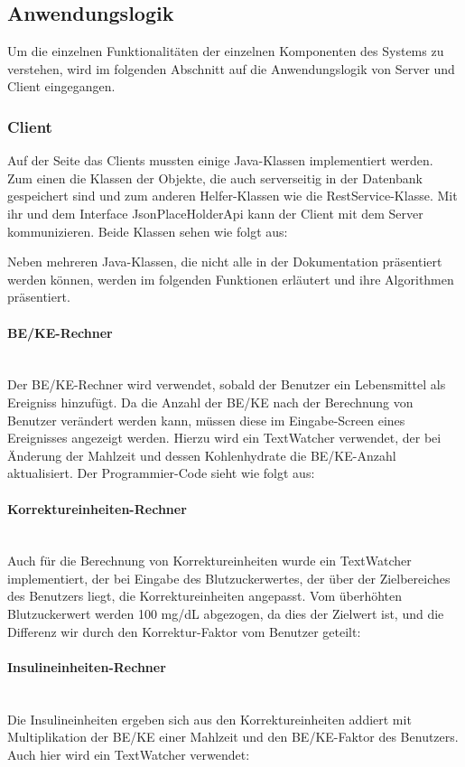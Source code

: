 	\subsection{Anwendungslogik}
	Um die einzelnen Funktionalitäten der einzelnen Komponenten des Systems zu verstehen, wird im folgenden Abschnitt auf die Anwendungslogik von Server und Client eingegangen.
	\subsubsection{Client}
	Auf der Seite das Clients mussten einige Java-Klassen implementiert werden. Zum einen die Klassen der Objekte, die auch serverseitig in der Datenbank gespeichert sind und zum anderen Helfer-Klassen wie die RestService-Klasse. Mit ihr und dem Interface JsonPlaceHolderApi kann der Client mit dem Server kommunizieren. Beide Klassen sehen wie folgt aus:
	
	
	Neben mehreren Java-Klassen, die nicht alle in der Dokumentation präsentiert werden können, werden im folgenden Funktionen erläutert und ihre Algorithmen präsentiert.
	\paragraph{BE/KE-Rechner}$~$\\
	Der BE/KE-Rechner wird verwendet, sobald der Benutzer ein Lebensmittel als Ereigniss hinzufügt. Da die Anzahl der BE/KE nach der Berechnung von Benutzer verändert werden kann, müssen diese im Eingabe-Screen eines Ereignisses angezeigt werden. Hierzu wird ein TextWatcher verwendet, der bei Änderung der Mahlzeit und dessen Kohlenhydrate die BE/KE-Anzahl aktualisiert. Der Programmier-Code sieht wie folgt aus:
	
	\paragraph{Korrektureinheiten-Rechner}$~$\\
	Auch für die Berechnung von Korrektureinheiten wurde ein TextWatcher implementiert, der bei Eingabe des Blutzuckerwertes, der über der Zielbereiches des Benutzers liegt, die Korrektureinheiten angepasst. Vom  überhöhten Blutzuckerwert werden 100 mg/dL abgezogen, da dies der Zielwert ist, und die Differenz wir durch den Korrektur-Faktor vom Benutzer geteilt:
	
	\paragraph{Insulineinheiten-Rechner}$~$\\
	Die Insulineinheiten ergeben sich aus den Korrektureinheiten addiert mit Multiplikation der BE/KE einer Mahlzeit und den BE/KE-Faktor des Benutzers. Auch hier wird ein TextWatcher verwendet:
	
